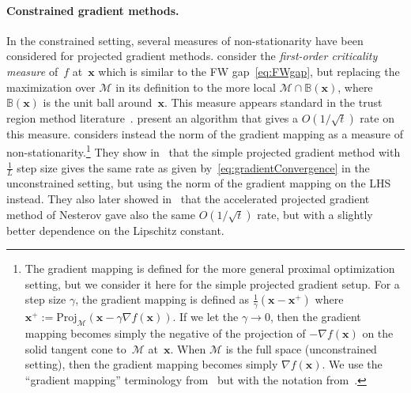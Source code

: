 \documentclass{article}
\newcommand{\x}{\bm{x}}
\newcommand{\domain}{\mathcal{M}} %
\newcommand{\stepsize}{\gamma}
\newcommand{\0}{\mathbf{0}} %
\begin{document}
\paragraph{Constrained gradient methods.} In the constrained setting, several measures of non-stationarity have been considered for projected gradient methods. \citet{Cartis2012a} consider the \emph{first-order criticality measure} of~$f$ at~$\x$ which is similar to the FW gap~\eqref{eq:FWgap}, but replacing the maximization over $\domain$ in its definition to the more local $\domain \cap \mathbb{B}(\x)$, where $\mathbb{B}(\x)$ is the unit ball around~$\x$. This measure appears standard in the trust region method literature~\citep{Conn1993}. \citet{Cartis2012a} present an algorithm that gives a $O(1/\sqrt{t})$ rate on this measure. \citet{ghadimi2016nonconvexPG} considers instead the norm of the gradient mapping as a measure of non-stationarity.\footnote{The gradient mapping is defined for the more general proximal optimization setting, but we consider it here for the simple projected gradient setup. For a step size $\stepsize$, the gradient mapping is defined as $\frac{1}{\stepsize}(\x - \x^+)$ where $\x^+ := \text{Proj}_\domain(\x - \stepsize \nabla f(\x))$. If we let the $\stepsize \rightarrow 0$, then the gradient mapping becomes simply the negative of the projection of $-\nabla f(\x)$ on the solid tangent cone to~$\domain$ at~$\x$. When $\domain$ is the full space (unconstrained setting), then the gradient mapping becomes simply $\nabla f(\x)$. We use the ``gradient mapping'' terminology from~\citep[Definition 2.2.3]{Nesterov:2004:lectures} but with the notation from~\citep{ghadimi2016nonconvexPG}.} They show in~\citet[Corollary~1]{ghadimi2016nonconvexPG} that the simple projected gradient method with $\frac{1}{L}$ step size gives the same rate as given by~\eqref{eq:gradientConvergence} in the unconstrained setting, but using the norm of the gradient mapping on the LHS instead. They also later showed in~\citet{ghadimi2016accelerated} that the accelerated projected gradient method of Nesterov gave also the same $O(1/\sqrt{t})$ rate, but with a slightly better dependence on the Lipschitz constant.

\clearpage

%


\end{document}
